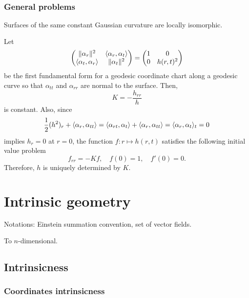 \documentclass{../exp}
\def\a{\alpha}
\begin{document}




\subsubsection{General problems}


\begin{thm}
Surfaces of the same constant Gaussian curvature are locally isomorphic.
\end{thm}
\begin{pf}
Let
\[\mat{\|\a_r\|^2&\<\a_r,\a_t\>\\\<\a_t,\a_r\>&\|\a_t\|^2}=\mat{1&0\\0&h(r,t)^2}\]
be the first fundamental form for a geodesic coordinate chart along a geodesic curve so that $\a_{tt}$ and $\a_{rr}$ are normal to the surface.
Then,
\[K=-\frac{h_{rr}}h\]
is constant.
Also, since
\[\frac12(h^2)_r+\<\a_r,\a_{tt}\>=\<\a_{rt},\a_t\>+\<\a_r,\a_{tt}\>=\<\a_r,\a_t\>_t=0\]
implies $h_r=0$ at $r=0$, the function $f:r\mapsto h(r,t)$ satisfies the following initial value problem
\[f_{rr}=-Kf,\quad f(0)=1,\quad f'(0)=0.\]
Therefore, $h$ is uniquely determined by $K$.
\end{pf}































\section{Intrinsic geometry}
Notations: Einstein summation convention, set of vector fields.

To $n$-dimensional.

\subsection{Intrinsicness}
\subsubsection{Coordinates intrinsicness}
\end{document}
